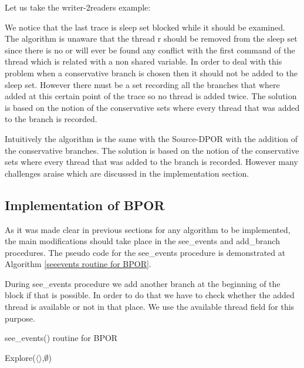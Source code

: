 Let us take the writer-2readers example:


We notice that the last trace is sleep set blocked while it should be examined. The algorithm is unaware that the thread r should be removed from the sleep set since there is no
or will ever be found any conflict with the first command of the thread which is related with a non shared variable. In order to deal with this problem when a conservative
branch is chosen then it should not be added to the sleep set. However there must be a set recording all the branches that where added at this certain point of the trace
so no thread is added twice. The solution is based on the notion of the conservative sets where every thread that was added to the branch is recorded. 

Intuitively the algorithm is the same with the Source-DPOR with the addition of the conservative branches. The solution is based on the notion of the conservative sets where every thread that was added to the branch is recorded.  However many challenges araise which are discussed 
in the implementation section.


\subsection{Implementation of BPOR}
As it was made clear in previous sections for any algorithm to be implemented, the main modifications should take place in the see\_events and add\_branch procedures. 
The pseudo code for the see\_events procedure is demonstrated at Algorithm \ref{seeevents routine for BPOR}.

During see\_events procedure we add another branch at the beginning of the block if that is possible. In order to do that we have to check whether the added thread
is available or not in that place. We use the available thread field for this purpose.

\begin{algorithm}[H]
    \caption{see\_events() routine for BPOR}
    \label{seeevents routine for BPOR}
    Explore($\langle \rangle$,$\emptyset$)\;
\end{algorithm}

